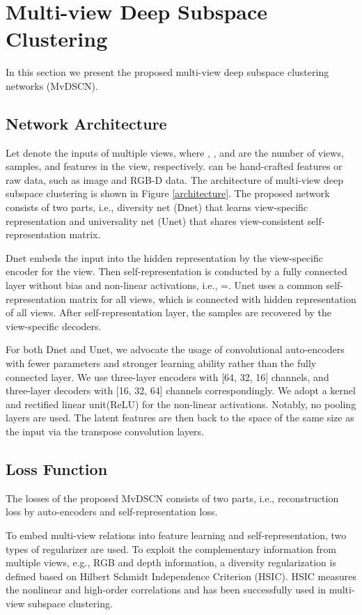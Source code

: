 \documentclass[journal]{IEEEtran}
\begin{document}
\section{Multi-view Deep Subspace Clustering}
\label{s3}

In this section we present the proposed multi-view deep subspace clustering networks (MvDSCN).
\subsection{Network Architecture}
Let  denote the inputs of multiple views, where , ,  and  are the number of views, samples, and features in the  view, respectively.
 can be hand-crafted features or raw data, such as image and RGB-D data.
The architecture of multi-view deep subspace clustering is shown in Figure \ref{architecture}.
The proposed network consists of two parts, i.e., diversity net (Dnet) that learns view-specific representation and universality net (Unet) that shares view-consistent self-representation matrix.

Dnet embeds the input  into the hidden representation  by the view-specific encoder for the  view.
Then self-representation is conducted by a fully connected layer without bias and non-linear activations, i.e., =.
Unet uses a common self-representation matrix  for all views, which is connected with hidden representation  of all views.
After self-representation layer, the samples are recovered by the view-specific decoders.

For both Dnet and Unet, we advocate the usage of convolutional auto-encoders with fewer parameters and stronger learning ability rather than the fully connected layer.
We use three-layer encoders with [64, 32, 16] channels, and three-layer decoders with [16, 32, 64] channels correspondingly.
We adopt a  kernel and rectified linear unit(ReLU) \cite{Nair2010RectifiedLU} for the non-linear activations.
Notably, no pooling layers are used. The latent features are then back to the space of the same size as the input via the transpose convolution layers.

\subsection{Loss Function}
The losses of the proposed MvDSCN consists of two parts, i.e., reconstruction loss by auto-encoders and self-representation loss.


To embed multi-view relations into feature learning and self-representation, two types of regularizer are used.
To exploit the complementary information from multiple views, e.g., RGB and depth information, a diversity regularization is defined based on Hilbert Schmidt Independence Criterion (HSIC).
HSIC measures the nonlinear and high-order correlations and has been successfully used in multi-view subspace clustering.
\end{document}
